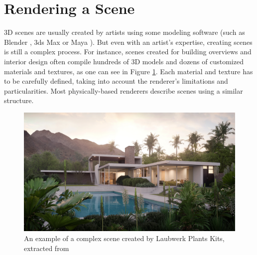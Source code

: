 \section{Rendering a Scene}
%
3D scenes are usually created by artists using some modeling 
software (such as Blender \cite{blender}, 3ds Max \cite{3dsmax} or Maya \cite{maya}).
%
But even with an artist’s expertise, creating scenes is still a complex process. 
For instance, scenes created for building overviews and interior design often 
compile hundreds of 3D models and dozens of customized materials and textures, 
as one can see in Figure \ref{fig:intro_complexScene}. Each material and texture 
has to be carefully defined, taking into account the renderer's limitations and 
particularities.
%
Most physically-based renderers describe scenes using a similar structure.

\begin{figure}[h]
  
\includegraphics[width=\textwidth,height=\textheight,keepaspectratio]{images/1_introduction/Laubwerk-Kit-12_Bauclassroom-Exterior.jpg}
  \caption{An example of a complex scene created by Laubwerk Plants Kits, extracted from \cite{laubwerk}}
  \label{fig:intro_complexScene}
\end{figure}

